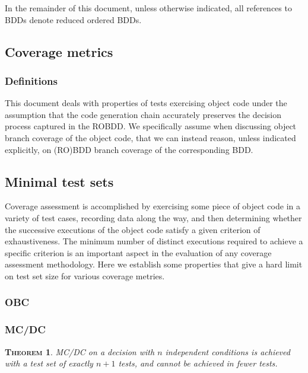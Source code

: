 \documentclass[a4paper,12pt,twoside]{article}
\newtheorem{theorem}{\textsc{Theorem}}
\begin{document}
In the remainder of this document, unless otherwise indicated, all
references to BDDs denote reduced ordered BDDs.

\subsection{Coverage metrics}

\subsubsection{Definitions}


This document deals with properties of tests exercising object code under
the assumption that the code generation chain accurately preserves the
decision process captured in the ROBDD. We specifically assume when
discussing object branch coverage of the object code, that we can instead
reason, unless indicated explicitly, on (RO)BDD branch coverage
of the corresponding BDD.

\subsection{Minimal test sets}

Coverage assessment is accomplished by exercising some piece of object
code in a variety of test cases, recording data along the way, and
then determining whether the successive executions of the object code
satisfy a given criterion of exhaustiveness. The minimum number of distinct
executions required to achieve a specific criterion is an important
aspect in the evaluation of any coverage assessment methodology. Here
we establish some properties that give a hard limit on test set size
for various coverage metries.

\subsubsection{OBC}

\subsubsection{MC/DC}

\begin{theorem}
MC/DC on a decision with $n$ independent conditions is achieved with
a test set of exactly $n+1$ tests, and cannot be achieved in fewer tests.
\end{theorem}
\end{document}
